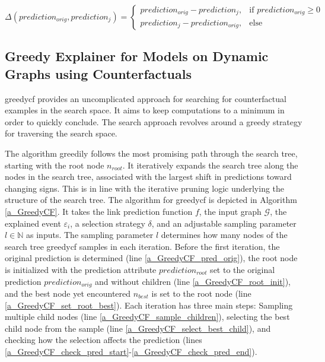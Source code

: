 \begin{equation}
\label{e_delta_function}
    \Delta(prediction_{orig}, prediction_j) = 
    \begin{cases}
        prediction_{orig} - prediction_j,  &\text{if } prediction_{orig} \geq 0 \\
        prediction_j - prediction_{orig},  &\text{else}
    \end{cases}
\end{equation}


\subsection{Greedy Explainer for Models on Dynamic Graphs using Counterfactuals}
\label{s_Methodology_GreedyCF}

\acrfull{greedycf} provides an uncomplicated approach for searching for counterfactual examples in the search space. It aims to keep computations to a minimum in order to quickly conclude. The search approach revolves around a greedy strategy for traversing the search space.

The algorithm greedily follows the most promising path through the search tree, starting with the root node $n_{root}$. It iteratively expands the search tree along the nodes in the search tree, associated with the largest shift in predictions toward changing signs. This is in line with the iterative pruning logic underlying the structure of the search tree. The algorithm for \gls{greedycf} is depicted in Algorithm \ref{a_GreedyCF}. It takes the link prediction function $f$, the input graph $\mathcal{G}$, the explained event $\varepsilon_i$, a selection strategy $\delta$, and an adjustable sampling parameter $l \in \mathbb{N}$ as inputs. The sampling parameter $l$ determines how many nodes of the search tree \gls{greedycf} samples in each iteration. Before the first iteration, the original prediction is determined (line \ref{a_GreedyCF_pred_orig}), the root node is initialized with the prediction attribute $prediction_{root}$ set to the original prediction $prediction_{orig}$ and without children (line \ref{a_GreedyCF_root_init}), and the best node yet encountered $n_{best}$ is set to the root node (line \ref{a_GreedyCF_set_root_best}). Each iteration has three main steps: Sampling multiple child nodes (line \ref{a_GreedyCF_sample_children}), selecting the best child node from the sample (line \ref{a_GreedyCF_select_best_child}), and checking how the selection affects the prediction (lines \ref{a_GreedyCF_check_pred_start}-\ref{a_GreedyCF_check_pred_end}). 


